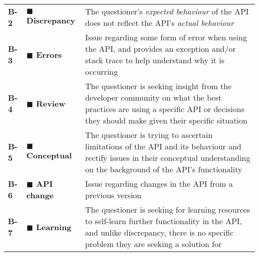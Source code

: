 \begin{table*}[tb]
{\begin{tabular}{l|p{.25\linewidth}p{.75\linewidth}}
    \textbf{B-2} &
    \textbf{$\blacksquare$ Discrepancy\dotfill} &
    The questioner's \textit{expected behaviour} of the API does not reflect the API's \textit{actual behaviour}
    \\

    \textbf{B-3} &
    \textbf{$\blacksquare$ Errors\dotfill} &
    Issue regarding some form of error when using the API, and provides an exception and/or stack trace to help understand why it is occurring
    \\

    \textbf{B-4} &
    \textbf{$\blacksquare$ Review\dotfill} &
    The questioner is seeking insight from the developer community on what the best practices are using a specific API or decisions they should make given their specific situation
    \\

    \textbf{B-5} &
    \textbf{$\blacksquare$ Conceptual\dotfill} &
    The questioner is trying to ascertain limitations of the API and its behaviour and rectify issues in their conceptual understanding on the background of the API's functionality
    \\

    \textbf{B-6} &
    \textbf{$\blacksquare$ API change\dotfill} &
    Issue regarding changes in the API from a previous version
    \\

    \textbf{B-7} &
    \textbf{$\blacksquare$ Learning\dotfill} &
    The questioner is seeking for learning resources to self-learn further functionality in the API, and unlike discrepancy, there is no specific problem they are seeking a solution for
    \\
    \bottomrule
  \end{tabular}}
  \vspace{-2mm}
\end{table*}


